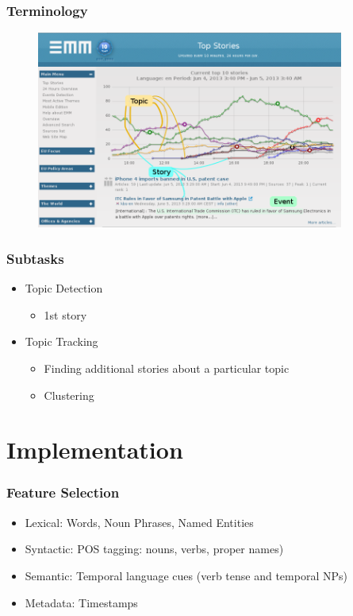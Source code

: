 \documentclass{beamer}
\begin{document}
\begin{frame}
  \frametitle{Terminology}
  \begin{figure}[h]
    \centering
    \includegraphics[width=0.9\textwidth]{images/emm_1}
  \end{figure}
\end{frame}

\begin{frame}
	\frametitle{Subtasks}
	\begin{itemize}
		\item Topic Detection
			\begin{itemize}
				\item 1st story
			\end{itemize}
		\item Topic Tracking
			\begin{itemize}
				\item Finding additional stories about a particular topic
				\item Clustering
			\end{itemize}
	\end{itemize}
\end{frame}

\section{Implementation}
\begin{frame}
	\frametitle{Feature Selection}
	\begin{itemize}
		\item Lexical: Words, Noun Phrases, Named Entities
		\item Syntactic: POS tagging: nouns, verbs, proper names)
		\item Semantic: Temporal language cues (verb tense and temporal NPs)\cite{Makkonen:2003:UTITDT}
		\item Metadata: Timestamps
	\end{itemize}
\end{frame}
\end{document}
